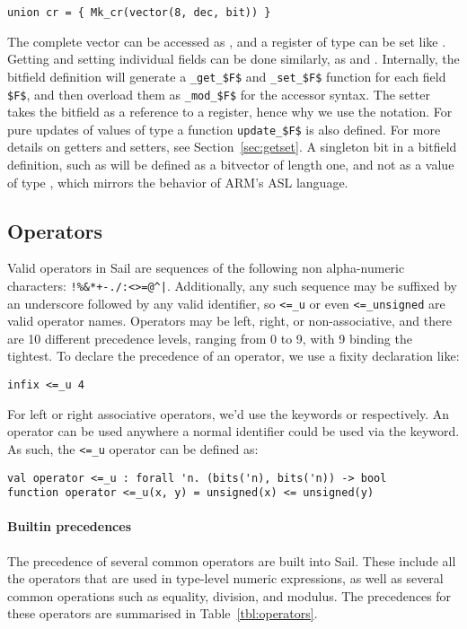 \begin{lstlisting}
union cr = { Mk_cr(vector(8, dec, bit)) }
\end{lstlisting}

The complete vector can be accessed as , and a register
of type  can be set like . Getting and
setting individual fields can be done similarly, as  and
. Internally, the bitfield definition will
generate a \lstinline[mathescape]{_get_$F$} and
\lstinline[mathescape]{_set_$F$} function for each field
\lstinline[mathescape]{$F$}, and then overload them as
\lstinline[mathescape]{_mod_$F$} for the accessor syntax. The setter
takes the bitfield as a reference to a register, hence why we use the
\ll{->} notation. For pure updates of values of type  a
function \lstinline[mathescape]{update_$F$} is also defined. For more
details on getters and setters, see Section~\ref{sec:getset}. A
singleton bit in a bitfield definition, such as  will be
defined as a bitvector of length one, and not as a value of type
, which mirrors the behavior of ARM's ASL language.

\subsection{Operators}

Valid operators in Sail are sequences of the following non
alpha-numeric characters: \verb#!%&*+-./:<>=@^|#. Additionally, any
such sequence may be suffixed by an underscore followed by any valid
identifier, so \verb#<=_u# or even \verb#<=_unsigned# are valid
operator names. Operators may be left, right, or non-associative, and
there are 10 different precedence levels, ranging from 0 to 9, with 9
binding the tightest. To declare the precedence of an operator, we use a fixity declaration like:
\begin{lstlisting}
infix <=_u 4
\end{lstlisting}
For left or right associative operators, we'd use the keywords
 or  respectively. An operator can be used
anywhere a normal identifier could be used via the 
keyword. As such, the \verb#<=_u# operator can be defined as:
\begin{lstlisting}
val operator <=_u : forall 'n. (bits('n), bits('n)) -> bool
function operator <=_u(x, y) = unsigned(x) <= unsigned(y)
\end{lstlisting}

\paragraph{Builtin precedences}
The precedence of several common operators are built into Sail. These
include all the operators that are used in type-level numeric
expressions, as well as several common operations such as equality,
division, and modulus. The precedences for these operators are
summarised in Table~\ref{tbl:operators}.

